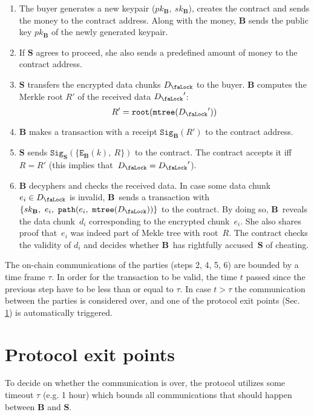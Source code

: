 \documentclass[a4paper]{article}
\newcommand{\Lock}{{D_\text{\faLock}}}
\newcommand{\Sign}{\mathtt{Sig}}
\newcommand{\Encrypt}{\mathtt{E}}
\newcommand{\MerkleTree}{\mathtt{mtree}}
\newcommand{\Root}{\mathtt{root}}
\newcommand{\Path}{\mathtt{path}}
\newcommand{\Party}[1]{\mathbf{#1}}
\newcommand{\PubKey}[1]{pk_{\Party{#1}}}
\newcommand{\SecretKey}[1]{sk_{\Party{#1}}}
\begin{document}
\begin{enumerate}
\item The buyer generates a new keypair ($\PubKey{B},\ \SecretKey{B}$), creates the contract and sends the money to the contract address. Along with the money, $\Party{B}$ sends the public key $\PubKey{B}$ of the newly generated keypair.
\item If $\Party{S}$ agrees to proceed, she also sends a predefined amount of money to the contract address.
\item $\Party{S}$ transfers the encrypted data chunks $\Lock$ to the buyer. $\Party{B}$ computes the Merkle root $R'$ of the received data $\Lock'$:
\begin{equation}
R' = \Root(\MerkleTree(\Lock'))
\end{equation}
\item $\Party{B}$ makes a transaction with a receipt $\Sign_\Party{B}(R')$ to the contract address.
\item $\Party{S}$ sends $\Sign_\Party{S}(\{\Encrypt_\Party{B}(k),\ R\})$ to the contract. The contract accepts it iff~$R=R'$ (this implies that~$\Lock=\Lock'$).
\item $\Party{B}$ decyphers and checks the received data. In case some data chunk $e_i \in \Lock$ is invalid, $\Party{B}$~sends a transaction with~$\{\SecretKey{B},\ e_i,\ \Path(e_i,\ \MerkleTree(\Lock))\}$ to the contract. By doing so, $\Party{B}$~reveals the data chunk~$d_i$ corresponding to the encrypted chunk~$e_i$.  She also shares proof that~$e_i$ was indeed part of Mekle tree with root~$R$. The contract checks the validity of $d_i$ and decides whether $\Party{B}$~has rightfully accused~$\Party{S}$ of cheating.
\end{enumerate}

The on-chain communications of the parties (steps 2, 4, 5, 6) are bounded by a time frame $\tau$. In order for the transaction to be valid, the time $t$ passed since the previous step have to be less than or equal to $\tau$. In case $t > \tau$ the communication between the parties is considered over, and one of the protocol exit points (Sec. \ref{sec:exit-points}) is automatically triggered.

\section{Protocol exit points}
\label{sec:exit-points}
To decide on whether the communication is over, the protocol utilizes some timeout $\tau$ (e.g. 1 hour) which bounds all communications that should happen between $\Party{B}$ and $\Party{S}$.
\end{document}
